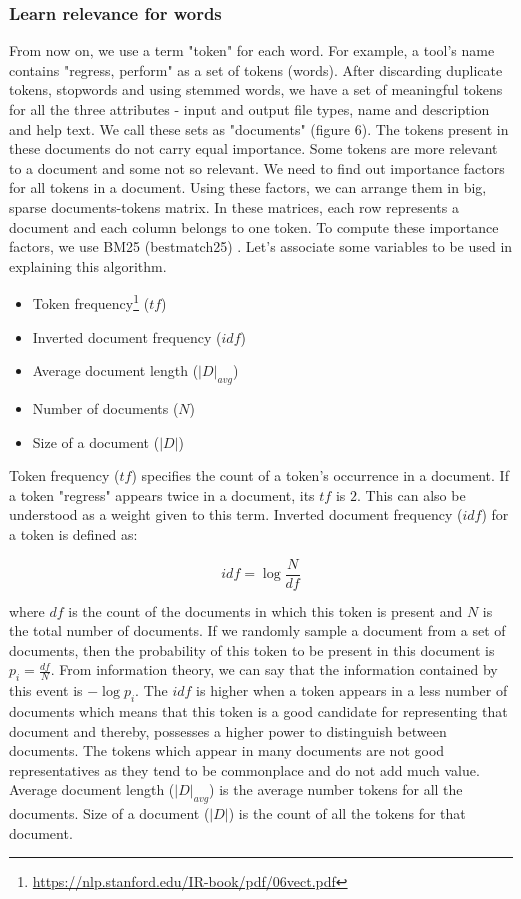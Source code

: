 \subsubsection{Learn relevance for words}
From now on, we use a term "token" for each word. For example, a tool's name contains "regress, perform" as a set of tokens (words). After discarding duplicate tokens, stopwords and using stemmed words, we have a set of meaningful tokens for all the three attributes - input and output file types, name and description and help text. We call these sets as "documents" (figure 6). The tokens present in these documents do not carry equal importance. Some tokens are more relevant to a document and some not so relevant. We need to find out importance factors for all tokens in a document. Using these factors, we can arrange them in big, sparse documents-tokens matrix. In these matrices, each row represents a document and each column belongs to one token. To compute these importance factors, we use BM25 (bestmatch25) \cite{RobertsonBM25}. Let's associate some variables to be used in explaining this algorithm.

\begin{itemize}
	\item Token frequency\footnote{\url{https://nlp.stanford.edu/IR-book/pdf/06vect.pdf}} ($tf$)
	\item Inverted document frequency ($idf$)
	\item Average document length ($|D|_{avg}$)
	\item Number of documents ($N$)
	\item Size of a document ($|D|$)
\end{itemize}
    
Token frequency ($tf$) specifies the count of a token's occurrence in a document. If a token "regress" appears twice in a document, its $tf$ is $2$. This can also be understood as a weight given to this term. Inverted document frequency ($idf$) for a token is defined as:

\begin{equation}
idf = \log \frac{N}{df}
\end{equation}
 
where $df$ is the count of the documents in which this token is present and $N$ is the total number of documents. If we randomly sample a document from a set of documents, then the probability of this token to be present in this document is $ p_i = \frac{df}{N} $. From information theory, we can say that the information contained by this event is $-\log p_i$. The $idf$ is higher when a token appears in a less number of documents which means that this token is a good candidate for representing that document and thereby, possesses a higher power to distinguish between documents. The tokens which appear in many documents are not good representatives as they tend to be commonplace and do not add much value. Average document length ($|D|_{avg}$) is the average number tokens for all the documents. Size of a document ($|D|$) is the count of all the tokens for that document. 

